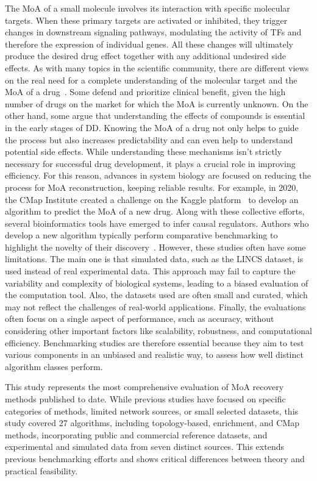 The \gls{MoA} of a small molecule involves its interaction with specific molecular targets. When these primary targets are activated or inhibited, they trigger changes in downstream signaling pathways, modulating the activity of \gls{TF}s and therefore the expression of individual genes. 
All these changes will ultimately produce the desired drug effect together with any additional undesired side effects. 
As with many topics in the scientific community, there are different views on the real need for a complete understanding of the molecular target and the \gls{MoA} of a drug~\cite{RN112}. 
Some defend and prioritize clinical benefit, given the high number of drugs on the market for which the \gls{MoA} is currently unknown. 
On the other hand, some argue that understanding the effects of compounds is essential in the early stages of \gls{DD}. 
Knowing the \gls{MoA} of a drug not only helps to guide the process but also increases predictability and can even help to understand potential side effects. 
While understanding these mechanisms isn't strictly necessary for successful drug development, it plays a crucial role in improving efficiency. 
For this reason, advances in system biology are focused on reducing the process for \gls{MoA} reconstruction, keeping reliable results. 
For example, in 2020, the \gls{CMap} Institute created a challenge on the Kaggle platform~\cite{RN162} to develop an algorithm to predict the \gls{MoA} of a new drug. 
Along with these collective efforts, several bioinformatics tools have emerged to infer causal regulators. 
Authors who develop a new algorithm typically perform comparative benchmarking to highlight the novelty of their discovery~\cite{RN109}. 
However, these studies often have some limitations. The main one is that simulated data, such as the \gls{LINCS} dataset, is used instead of real experimental data. 
This approach may fail to capture the variability and complexity of biological systems, leading to a biased evaluation of the computation tool. Also, the datasets used are often small and curated, which may not reflect the challenges of real-world applications.
Finally, the evaluations often focus on a single aspect of performance, such as accuracy, without considering other important factors like scalability, robustness, and computational efficiency. 
Benchmarking studies are therefore essential because they aim to test various components in an unbiased and realistic way, to assess how well distinct algorithm classes perform.

This study represents the most comprehensive evaluation of \gls{MoA} recovery methods published to date. 
While previous studies have focused on specific categories of methods, limited network sources, or small selected datasets, this study covered 27 algorithms, including topology-based, enrichment, and \gls{CMap} methods, incorporating public and commercial reference datasets, and experimental and simulated data from seven distinct sources. 
This extends previous benchmarking efforts and shows critical differences between theory and practical feasibility.


